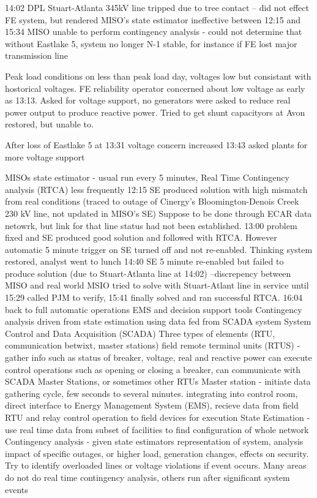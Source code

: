 14:02 DPL Stuart-Atlanta 345kV line tripped due to tree contact 
-- did not effect FE system, but rendered MISO's state estimator ineffective between 12:15 and 15:34  MISO unable to perform contingency analysis - could not determine that without Eastlake 5, system no longer N-1 stable, for instance if FE lost major transmission line

Peak load conditions on less than peak load day, voltages low but consistant with hostorical voltages.  FE reliability operator concerned about low voltage as early as 13:13.  Asked for voltage support, no generators were asked to reduce real power output to produce reactive power.  Tried to get shunt capacityors at Avon restored, but unable to.

After loss of Eastlake 5 at 13:31 voltage concern increased
13:43 asked plants for more voltage support

MISOs state estimator - usual run every 5 minutes, Real Time Contingency analysis (RTCA) less frequently
12:15 SE produced solution with high mismatch from real conditions
(traced to outage of Cinergy's Bloomington-Denois Creek 230 kV line, not updated in MISO's SE)
Suppose to be done through ECAR data netowrk, but link for that line status had not been established.
13:00 problem fixed and SE produced good solution and followed with RTCA.  However automatic 5 minute trigger on SE turned off and not re-enabled.  Thinking system restored, analyst went to lunch
14:40 SE 5 minute re-enabled but failed to produce solution (due to Stuart-Atlanta line at 14:02)
--discrepency between MISO and real world
MSIO tried to solve with Stuart-Atlant line in service until 15:29
called PJM to verify, 
15:41 finally solved and ran successful RTCA.
16:04 back to full automatic operations
EMS and decision support tools
Contingency analysis driven from state estimation using data fed from SCADA system
System Control and Data Acquisition (SCADA)
Three types of elements (RTU, communication betwixt, master stations)
field remote terminal units (RTUS) - gather info such as status of breaker, voltage, real and reactive power can execute control operations such as opening or closing a breaker, can communicate with SCADA Master Stations, or sometimes other RTUs
Master station - initiate data gathering cycle, few seconds to several minutes.  integrating into control room, direct interface to Energy Management System (EMS), recieve data from field RTU and relay control operation to field devices for execution
State Estimation - use real time data from subset of facilities to find configuration of whole network
Contingency analysis - given state estimators representation of system, analysis impact of specific outages, or higher load, generation changes, effects on security.  Try to identify overloaded lines or voltage violations if event occurs.  Many areas do not do real time contingency analysis, others run after significant system events

